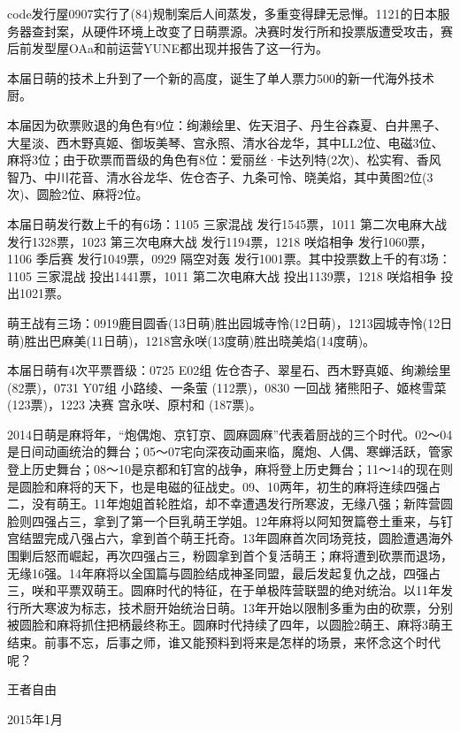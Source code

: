 code发行屋0907实行了(84)规制案后人间蒸发，多重变得肆无忌惮。1121的日本服务器查封案，从硬件环境上改变了日萌票源。决赛时发行所和投票版遭受攻击，赛后前发型屋OAa和前运营YUNE都出现并报告了这一行为。

本届日萌的技术上升到了一个新的高度，诞生了单人票力500的新一代海外技术厨。

本届因为砍票败退的角色有9位：绚濑绘里、佐天泪子、丹生谷森夏、白井黑子、大星淡、西木野真姬、御坂美琴、宫永照、清水谷龙华，其中LL2位、电磁3位、麻将3位；由于砍票而晋级的角色有8位：爱丽丝·卡达列特(2次)、松实宥、香风智乃、中川花音、清水谷龙华、佐仓杏子、九条可怜、晓美焰，其中黄图2位(3次)、圆脸2位、麻将2位。

本届日萌发行数上千的有6场：1105 三家混战 发行1545票，1011 第二次电麻大战 发行1328票，1023 第三次电麻大战 发行1194票，1218 咲焰相争 发行1060票，1106 季后赛 发行1049票，0929 隔空对轰 发行1001票。其中投票数上千的有3场：1105 三家混战 投出1441票，1011 第二次电麻大战 投出1139票，1218 咲焰相争 投出1021票。

萌王战有三场：0919鹿目圆香(13日萌)胜出园城寺怜(12日萌)，1213园城寺怜(12日萌)胜出巴麻美(11日萌)，1218宫永咲(13度萌)胜出晓美焰(14度萌)。

本届日萌有4次平票晋级：0725 E02组 佐仓杏子、翠星石、西木野真姬、绚濑绘里 (82票)，0731 Y07组 小路绫、一条萤 (112票)，0830 一回战 猪熊阳子、姬柊雪菜 (123票)，1223 决赛 宫永咲、原村和 (187票)。

2014日萌是麻将年，“炮偶炮、京钉京、圆麻圆麻”代表着厨战的三个时代。02～04是日间动画统治的舞台；05～07宅向深夜动画来临，魔炮、人偶、寒蝉活跃，管家登上历史舞台；08～10是京都和钉宫的战争，麻将登上历史舞台；11～14的现在则是圆脸和麻将的天下，也是电磁的征战史。09、10两年，初生的麻将连续四强占二，没有萌王。11年炮姐首轮胜焰，却不幸遭遇发行所寒波，无缘八强；新阵营圆脸则四强占三，拿到了第一个巨乳萌王学姐。12年麻将以阿知贺篇卷土重来，与钉宫结盟完成八强占六，拿到首个萌王托奇。13年圆麻首次同场竞技，圆脸遭遇海外围剿后怒而崛起，再次四强占三，粉圆拿到首个复活萌王；麻将遭到砍票而退场，无缘16强。14年麻将以全国篇与圆脸结成神圣同盟，最后发起复仇之战，四强占三，咲和平票双萌王。圆麻时代的特征，在于单极阵营联盟的绝对统治。以11年发行所大寒波为标志，技术厨开始统治日萌。13年开始以限制多重为由的砍票，分别被圆脸和麻将抓住把柄最终称王。圆麻时代持续了四年，以圆脸2萌王、麻将3萌王结束。前事不忘，后事之师，谁又能预料到将来是怎样的场景，来怀念这个时代呢？

\begin{flushright}
  \rm\kasho 王者自由

  \kai 2015年1月
\end{flushright}

